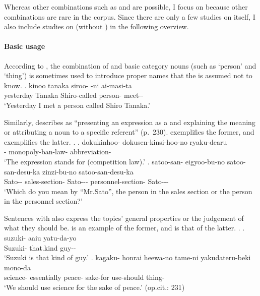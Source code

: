 Whereas other combinations such as  and  are possible,
I focus on  because other combinations are rare in the corpus.
Since there are only a few studies on  itself,
I also include studies on  (without ) in the following overview.

\paragraph{Basic usage}

According to ,
the combination of
 and basic category nouns (such as  `person' and  `thing') is sometimes used to introduce proper names that the  is assumed not to know.
%
\exg. kinoo tanaka siroo- -ni ai-masi-ta \\
	yesterday Tanaka Shiro-called person- meet-- \\
	`Yesterday I met a person called Shiro Tanaka.'
	\hfill{\cite[][p.\ 218]{takubo89}}


Similarly,  describes  as
``presenting an expression as a  and explaining the meaning or
attributing a noun to a specific referent'' (p.~230).
\Next[a] exemplifies the former, and
\Next[b] exemplifies the latter.
%
\ex.
 \ag. dokukinhoo- dokusen-kinsi-hoo-no ryaku-dearu \\
      - monopoly-ban-law- abbreviation- \\
      `The expression  stands for  (competition law).'
 \bg. satoo-san- eigyoo-bu-no satoo-san-desu-ka zinzi-bu-no satoo-san-desu-ka\\
      Sato-- sales-section- Sato--- personnel-section- Sato---\\
      `Which do you mean by ``Mr.Sato'', the person in the sales section or the person in the personnel section?'
      \hfill{\cite[230]{kijutubumpokenkyukai09}}


Sentences with  also express
the topics' general properties or the judgement of what they should be.
\Next[a] is an example of the former, and
\Next[b] is that of the latter.
%
\ex.
 \ag. suzuki- aaiu yatu-da-yo \\
      Suzuki- that.kind guy-- \\
      `Suzuki is that kind of guy.'
 \bg. kagaku- honrai heewa-no tame-ni yakudateru-beki mono-da \\
      science- essentially peace- sake-for use-should thing- \\
      `We should use science for the sake of peace.'
      \hfill{(op.cit.: 231)}



